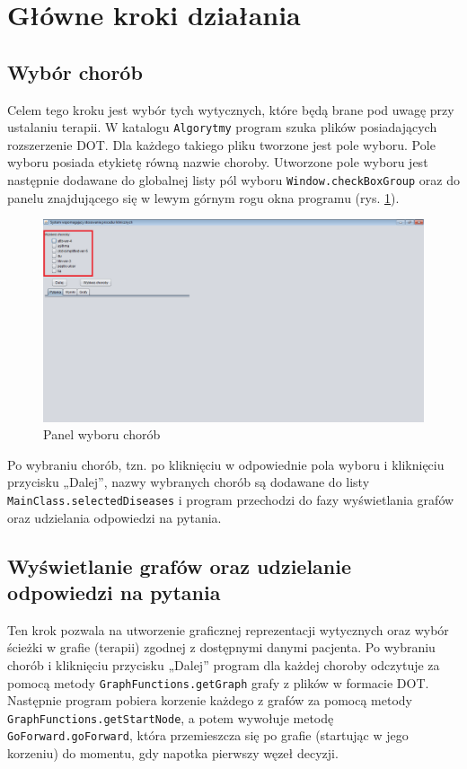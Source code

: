 \section{Główne kroki działania}
\label{sec:kroki}

\subsection{Wybór chorób}
Celem tego kroku jest wybór tych wytycznych, które będą brane pod uwagę przy ustalaniu terapii. W katalogu \texttt{Algorytmy} program szuka plików posiadających rozszerzenie DOT. Dla każdego takiego pliku tworzone jest pole wyboru. Pole wyboru posiada etykietę równą nazwie choroby. Utworzone pole wyboru jest następnie dodawane do globalnej listy 
pól wyboru \texttt{Window.checkBoxGroup} oraz do panelu 
znajdującego się w lewym górnym rogu okna programu (rys. \ref{fig:wybor_chorob}). 
\begin{figure}[H]
\centering
\includegraphics[width=\textwidth]{img/wybor_chorob.png}
\caption{Panel wyboru chorób}
\label{fig:wybor_chorob}
\end{figure}
Po wybraniu chorób, tzn. po kliknięciu w odpowiednie pola wyboru i kliknięciu przycisku „Dalej”, nazwy wybranych chorób są dodawane do listy \texttt{MainClass.selectedDiseases} i program przechodzi do fazy wyświetlania grafów oraz udzielania odpowiedzi na pytania. 

\subsection{Wyświetlanie grafów oraz udzielanie odpowiedzi na pytania}
Ten krok pozwala na utworzenie graficznej reprezentacji wytycznych oraz wybór ścieżki w grafie (terapii) zgodnej z dostępnymi danymi pacjenta. Po wybraniu chorób i kliknięciu przycisku „Dalej” program dla każdej choroby odczytuje za pomocą metody \texttt{GraphFunctions.getGraph} grafy z plików w formacie DOT. Następnie program pobiera korzenie każdego z grafów za pomocą metody \texttt{GraphFunctions.get\-StartNode}, a potem wywołuje metodę \texttt{GoForward.goForward}, która przemieszcza się po grafie (startując w jego korzeniu) do momentu, gdy napotka pierwszy węzeł decyzji. 

